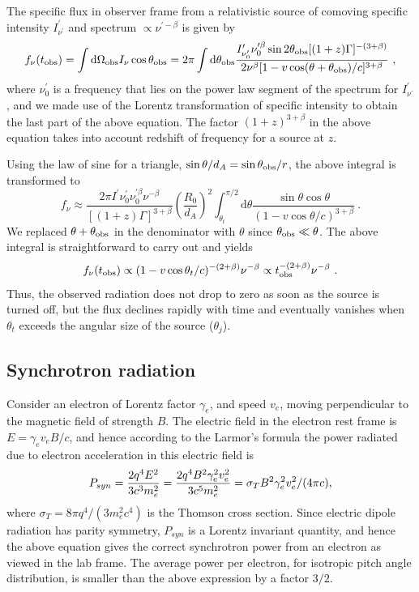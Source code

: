 \documentclass[12pt,a4paper]{article}
\newcommand{\dif}{\mathrm{d}}
\begin{document}
The specific flux in observer frame from a relativistic source of comoving specific intensity $I^\prime_{\nu^\prime}$ and spectrum $\propto \nu^{\prime -\beta}$ is given by
\begin{equation}
f_\nu(t_{\rm obs}) = \int \dif \Omega_{\rm obs} I_\nu \cos \theta_{\rm obs} = 2\pi \int \dif \theta_{\rm obs} \dfrac{I^\prime_{\nu^\prime_0} \nu^{\prime \beta}_0 \sin 2\theta_{\rm obs} [(1+z) \Gamma]^{-(3+\beta)} }{2\nu^\beta [1-v \cos(\theta +\theta_{\rm obs})/c]^{3+\beta} }~,
\end{equation}
where $\nu^\prime_0$ is a frequency that lies on the power law segment of the spectrum for $I^\prime_{\nu^\prime}$, and we made use of the Lorentz transformation of specific intensity to obtain the last part of the above equation. The factor $(1 + z )^{3+\beta}$ in the above equation takes into account redshift of frequency for a source at $z$.

Using the law of sine for a triangle, $\sin \theta/d_A = \sin \theta_{\rm obs}/r$, the above integral is transformed to 
\begin{equation}
f_\nu \approx \dfrac{2\pi I^\prime \nu^\prime_0 \nu^{\prime \beta}_0 \nu^{-\beta} }{[(1+z) \Gamma]^{3+\beta} } \left(\dfrac{R_0}{d_A} \right)^2 \int_{\theta_t}^{\pi/2} \dif \theta \dfrac{\sin \theta \cos \theta}{(1-v\cos \theta/c)^{3+\beta} } ~.
\end{equation}
We replaced $\theta + \theta_{\rm obs}$ in the denominator with $\theta$ since $\theta_{\rm obs} \ll \theta$. The above integral is straightforward to carry out and yields
\begin{equation}
f_\nu(t_{\rm obs}) \propto (1-v\cos \theta_t/c)^{-(2+\beta)} \nu^{-\beta} \propto t_{\rm obs}^{-(2+\beta)} \nu^{-\beta} ~.
\end{equation}
Thus, the observed radiation does not drop to zero as soon as the source is turned off, but the flux declines rapidly with time and eventually vanishes when $\theta_t$ exceeds the angular size of the source ($\theta_j$).

\subsection{Synchrotron radiation}
Consider an electron of Lorentz factor $\gamma_e$, and speed $v_e$, moving perpendicular to the magnetic field of strength $B$. 
The electric field in the electron rest frame is $E = \gamma_e v_e B/c$, and hence according to the Larmor's formula the power 
radiated due to electron acceleration in this electric field is 
\begin{equation}
    P_{syn} = {2 q^4 E^2 \over 3 c^3 m_e^2} = {2 q^4 B^2 \gamma_e^2
  v_e^2\over 3 c^5 m_e^2} = \sigma_T B^2 \gamma_e^2 v_e^2/(4\pi c),
  \label{P_syn}
\end{equation}
where $\sigma_T = 8\pi q^4/(3 m_e^2 c^4)$ is the Thomson cross section. Since electric dipole radiation has parity symmetry, $P_{syn}$ is a Lorentz invariant quantity, and hence the above equation gives the correct synchrotron power from an electron as viewed in the lab frame. The average power per electron, for isotropic pitch angle distribution, is smaller than the above expression by a factor $3/2$.
\end{document}
